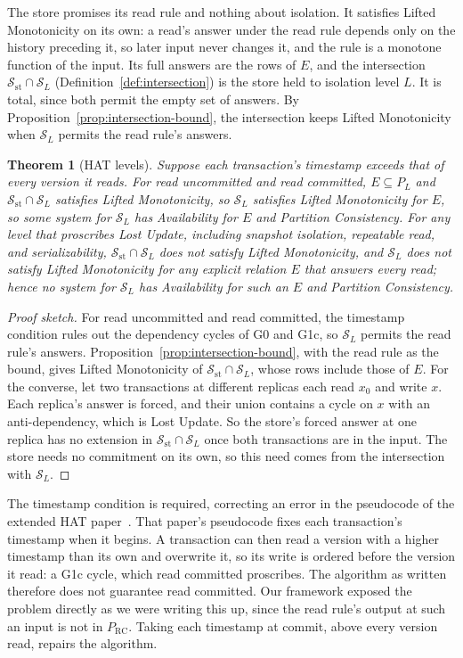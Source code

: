 \documentclass[sigconf]{cidr-2027}
\newtheorem{theorem}{Theorem}
\theoremstyle{remark}
\newcommand{\commitment}{commitment\xspace}
\newcommand{\Spec}{\mathcal{S}}
\begin{document}
\color{blue!70!black}The store promises its read rule and nothing about isolation.  It satisfies
Lifted Monotonicity on its own: a read's answer under the read rule depends
only on the history preceding it, so later input never changes it, and the rule
is a monotone function of the input.  Its full answers are the rows of $E$, and
the intersection $\Spec_{\mathrm{st}}\cap\Spec_L$
(Definition~\ref{def:intersection}) is the store held to isolation level $L$.
It is total, since both permit the empty set of answers.  By
Proposition~\ref{prop:intersection-bound}, the intersection keeps Lifted
Monotonicity when $\Spec_L$ permits the read rule's answers.\color{black}

\begin{theorem}[HAT levels]
\label{thm:hat-levels}
Suppose each transaction's timestamp exceeds that of every version it reads.
For read uncommitted and read committed, $E\subseteq P_L$ and
$\Spec_{\mathrm{st}}\cap\Spec_L$ satisfies Lifted Monotonicity, so $\Spec_L$
satisfies Lifted Monotonicity for $E$, so some system for $\Spec_L$ has
Availability for $E$ and Partition Consistency.  For any level that proscribes
Lost Update, including snapshot isolation, repeatable read, and
serializability, $\Spec_{\mathrm{st}}\cap\Spec_L$ does not satisfy Lifted
Monotonicity, and $\Spec_L$ does not satisfy Lifted Monotonicity for any
explicit relation $E$ that answers every read; hence no system for $\Spec_L$
has Availability for such an $E$ and Partition Consistency.
\end{theorem}

\begin{proof}[Proof sketch]
For read uncommitted and read committed, the timestamp condition rules out the
dependency cycles of G0 and G1c, so $\Spec_L$ permits the read rule's answers.
Proposition~\ref{prop:intersection-bound}, with the read rule as the bound,
gives Lifted Monotonicity of $\Spec_{\mathrm{st}}\cap\Spec_L$, whose rows
include those of $E$.  For the converse, let two transactions at different
replicas each read $x_0$ and write $x$.  Each replica's answer is forced, and
their union contains a cycle on $x$ with an anti-dependency, which is Lost
Update.  So the store's forced answer at one replica has no extension in
$\Spec_{\mathrm{st}}\cap\Spec_L$ once both transactions are in the input.
The store needs no \commitment on its own, so this need comes from the
intersection with $\Spec_L$.
\end{proof}

The timestamp condition is required, correcting an error in the pseudocode of
the extended HAT paper~\cite{bailis2013hatextended}.  That paper's pseudocode
fixes each transaction's timestamp when it begins.  A transaction can then read
a version with a higher timestamp than its own and overwrite it, so its write
is ordered before the version it read: a G1c cycle, which read committed
proscribes.  The algorithm as written therefore does not guarantee read
committed.  Our framework exposed the problem directly as we were writing this
up, since the read rule's output at such an input is not in $P_{\mathrm{RC}}$.
Taking each timestamp at commit, above every version read, repairs the
algorithm.
\end{document}
